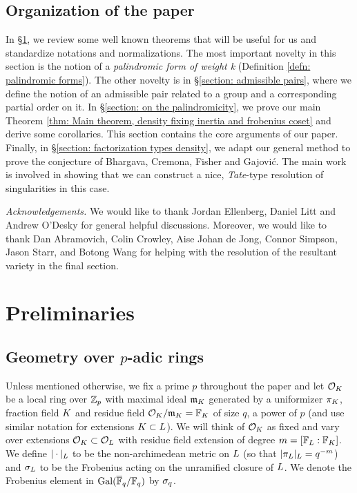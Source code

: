 \documentclass[10pt]{article}
\theoremstyle{plain}
\theoremstyle{definition}
\numberwithin{equation}{section}
\begin{document}
\subsection{Organization of the paper}

In \S \ref{section: preliminaries}, we review some well known theorems that will be useful for us and standardize notations and normalizations. The most important novelty in this section is the notion of a \emph{palindromic form of weight k} (Definition \ref{defn: palindromic forms}). The other novelty is in \S \ref{section: admissible pairs}, where we define the notion of an admissible pair related to a group and a corresponding partial order on it. In \S \ref{section: on the palindromicity}, we prove our main Theorem \ref{thm: Main theorem, density fixing inertia and frobenius coset} and derive some corollaries. This section contains the core arguments of our paper. Finally, in \S \ref{section: factorization types density}, we adapt our general method to prove the conjecture of Bhargava, Cremona, Fisher and Gajović. The main work is involved in showing that we can construct a nice, \emph{Tate}-type resolution of singularities in this case.


\textit{Acknowledgements.} We would like to thank Jordan Ellenberg, Daniel Litt and Andrew O'Desky for general helpful discussions. Moreover, we would like to thank Dan Abramovich, Colin Crowley, Aise Johan de Jong, Connor Simpson, Jason Starr, and Botong Wang for helping with the resolution of the resultant variety in the final section.

\section{Preliminaries}\label{section: preliminaries}

\subsection{Geometry over $p$-adic rings}

Unless mentioned otherwise, we fix a prime $p$ throughout the paper and let ${{\mathcal O}_{K}}$ be a local ring over ${\mathbb Z}_p$ with maximal ideal $\mathfrak m_K$ generated by a uniformizer $\pi_K$, fraction field $K$ and residue field ${{\mathcal O}_{K}}/\mathfrak m_K= {\mathbb F_K}$ of size $q$, a power of $p$ (and use similar notation for extensions $K \subset {L}$). We will think of ${{\mathcal O}_{K}}$ as fixed and vary over extensions ${{\mathcal O}_{K}} \subset { {\mathcal O} _{L}}$ with residue field extension of degree $m = [{\mathbb F_{L}}:{\mathbb F_K}]$. We define $|\cdot |_{{L}}$ to be the non-archimedean metric on ${L}$ (so that $|\pi_{L}|_{L} = q^{-m}$) and $\sigma_{L}$ to be the Frobenius acting on the unramified closure of ${L}$. We denote the Frobenius element in $\operatorname{Gal}(\overline{\mathbb F}_q/\mathbb F_q)$ by $\sigma_q$.
\end{document}
